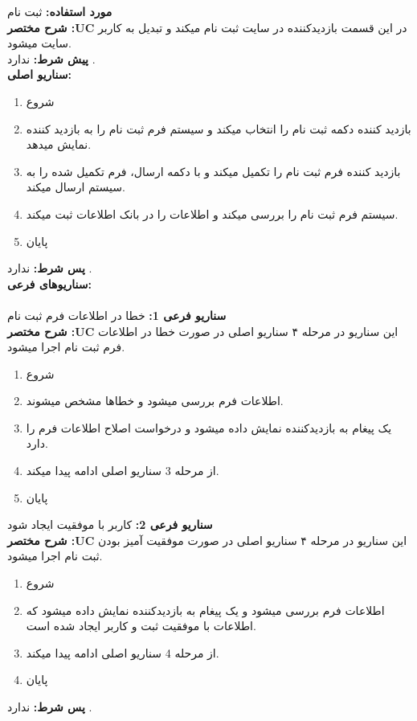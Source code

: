 
\noindent \textbf{مورد استفاده:}
ثبت نام
\\
\textbf{شرح مختصر :UC}
در این قسمت بازدیدکننده در سایت ثبت نام میکند و تبدیل به کاربر سایت میشود.
\\
\textbf{پيش شرط:}
ندارد .
\\
\textbf{سناريو اصلی:}
\begin{enumerate}
\item 
شروع
\item 
بازدید کننده دکمه ثبت نام را انتخاب میکند و سیستم فرم ثبت نام را به بازدید کننده نمایش میدهد.
\item 
بازدید کننده فرم ثبت نام را تکمیل میکند و با دکمه ارسال، فرم تکمیل شده را به سیستم ارسال میکند.
\item 
سیستم فرم ثبت نام را بررسی میکند و اطلاعات را در بانک اطلاعات ثبت میکند.
\item 
پایان
\end{enumerate}
\textbf{پس شرط:}
ندارد .
\\
\textbf{سناريوهای فرعی:}
\\ \\
\textbf{سناريو فرعی 1:}
خطا در اطلاعات فرم ثبت نام
\\
\textbf{شرح مختصر :UC}
این سناریو در مرحله ۴ سناریو اصلی در صورت خطا در اطلاعات فرم ثبت نام اجرا میشود.
\begin{enumerate}
\item 
شروع
\item 
اطلاعات فرم بررسی میشود و خطاها مشخص میشوند.
\item 
یک پیغام به بازدیدکننده نمایش داده میشود و درخواست اصلاح اطلاعات فرم را دارد.
\item 
از مرحله 3 سناریو اصلی ادامه پیدا میکند.
\item 
پایان
\end{enumerate}
\textbf{سناريو فرعی 2:}
کاربر با موفقیت ایجاد شود
\\
\textbf{شرح مختصر :UC}
این سناریو در مرحله ۴ سناریو اصلی در صورت موفقیت آمیز بودن ثبت نام اجرا میشود.
\begin{enumerate}
\item 
شروع
\item 
اطلاعات فرم بررسی میشود و یک پیغام به بازدیدکننده نمایش داده میشود که اطلاعات با موفقیت ثبت و کاربر ایجاد شده است.
\item 
از مرحله 4 سناریو اصلی ادامه پیدا میکند.
\item 
پایان
\end{enumerate}

\textbf{پس شرط:}
ندارد .

